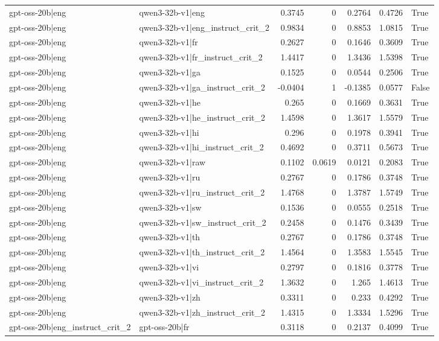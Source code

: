 \begin{table}
\begin{tabular}{l l r r r r l}
gpt-oss-20b|eng & qwen3-32b-v1|eng & 0.3745 & 0 & 0.2764 & 0.4726 & True \\
gpt-oss-20b|eng & qwen3-32b-v1|eng_instruct_crit_2 & 0.9834 & 0 & 0.8853 & 1.0815 & True \\
gpt-oss-20b|eng & qwen3-32b-v1|fr & 0.2627 & 0 & 0.1646 & 0.3609 & True \\
gpt-oss-20b|eng & qwen3-32b-v1|fr_instruct_crit_2 & 1.4417 & 0 & 1.3436 & 1.5398 & True \\
gpt-oss-20b|eng & qwen3-32b-v1|ga & 0.1525 & 0 & 0.0544 & 0.2506 & True \\
gpt-oss-20b|eng & qwen3-32b-v1|ga_instruct_crit_2 & -0.0404 & 1 & -0.1385 & 0.0577 & False \\
gpt-oss-20b|eng & qwen3-32b-v1|he & 0.265 & 0 & 0.1669 & 0.3631 & True \\
gpt-oss-20b|eng & qwen3-32b-v1|he_instruct_crit_2 & 1.4598 & 0 & 1.3617 & 1.5579 & True \\
gpt-oss-20b|eng & qwen3-32b-v1|hi & 0.296 & 0 & 0.1978 & 0.3941 & True \\
gpt-oss-20b|eng & qwen3-32b-v1|hi_instruct_crit_2 & 0.4692 & 0 & 0.3711 & 0.5673 & True \\
gpt-oss-20b|eng & qwen3-32b-v1|raw & 0.1102 & 0.0619 & 0.0121 & 0.2083 & True \\
gpt-oss-20b|eng & qwen3-32b-v1|ru & 0.2767 & 0 & 0.1786 & 0.3748 & True \\
gpt-oss-20b|eng & qwen3-32b-v1|ru_instruct_crit_2 & 1.4768 & 0 & 1.3787 & 1.5749 & True \\
gpt-oss-20b|eng & qwen3-32b-v1|sw & 0.1536 & 0 & 0.0555 & 0.2518 & True \\
gpt-oss-20b|eng & qwen3-32b-v1|sw_instruct_crit_2 & 0.2458 & 0 & 0.1476 & 0.3439 & True \\
gpt-oss-20b|eng & qwen3-32b-v1|th & 0.2767 & 0 & 0.1786 & 0.3748 & True \\
gpt-oss-20b|eng & qwen3-32b-v1|th_instruct_crit_2 & 1.4564 & 0 & 1.3583 & 1.5545 & True \\
gpt-oss-20b|eng & qwen3-32b-v1|vi & 0.2797 & 0 & 0.1816 & 0.3778 & True \\
gpt-oss-20b|eng & qwen3-32b-v1|vi_instruct_crit_2 & 1.3632 & 0 & 1.265 & 1.4613 & True \\
gpt-oss-20b|eng & qwen3-32b-v1|zh & 0.3311 & 0 & 0.233 & 0.4292 & True \\
gpt-oss-20b|eng & qwen3-32b-v1|zh_instruct_crit_2 & 1.4315 & 0 & 1.3334 & 1.5296 & True \\
gpt-oss-20b|eng_instruct_crit_2 & gpt-oss-20b|fr & 0.3118 & 0 & 0.2137 & 0.4099 & True \\

\end{tabular}
\end{table}
